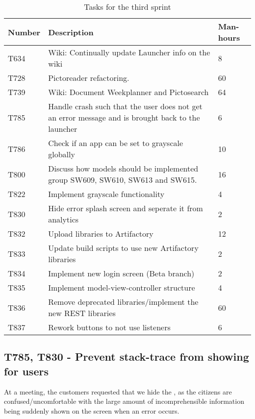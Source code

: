 \begin{table}[H]
\begin{centering}
\begin{tabular}{|l|p{9cm}|l|}
\hline
Number 	& Description & Man-hours \\ \hline
T634   	& Wiki: Continually update Launcher info on the wiki & 8\\\hline
T728  	& Pictoreader refactoring. & 60 \\ \hline
T739	& Wiki: Document Weekplanner and Pictosearch & 64\\ \hline
T785	& Handle crash such that the user does not get an error message and is
		  brought back to the launcher & 6\\ \hline
T786 	& Check if an app can be set to grayscale globally & 10\\ \hline
T800 	& Discuss how models should be implemented group SW609, SW610, SW613 and
		  SW615. & 16\\ \hline
T822 	& Implement grayscale functionality & 4\\ \hline
T830 	& Hide error splash screen and seperate it from analytics & 2\\ \hline
T832 	& Upload libraries to Artifactory & 12\\ \hline
T833 	& Update build scripts to use new Artifactory libraries & 2\\ \hline
T834 	& Implement new login screen (Beta branch) & 2\\ \hline
T835 	& Implement model-view-controller structure & 4\\ \hline
T836 	& Remove deprecated libraries/implement the new REST libraries & 60\\
\hline T837 	& Rework buttons to not use listeners & 6\\ \hline
\end{tabular}
\caption{Tasks for the third sprint}
\label{Tasks3}
\end{centering}
\end{table}

\subsection{T785, T830 - Prevent stack-trace from showing for
users}\label{T785-T830} 
At a meeting, the customers requested that we hide the
, as the citizens are confused/uncomfortable with the
large amount of incomprehensible information being suddenly shown on the screen
when an error occurs.\nl

